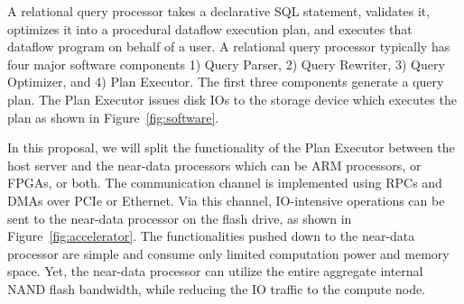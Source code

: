 \documentclass{article}
\begin{document}
A relational query processor takes a declarative SQL statement, validates it, optimizes it into a procedural dataflow execution plan, and executes that dataflow program on behalf of a user.
A relational query processor typically has four major software components 1) Query Parser, 2) Query Rewriter, 3) Query Optimizer, and 4) Plan Executor.
The first three components generate a query plan. The Plan Executor issues disk IOs to the storage device which executes the plan as shown in Figure~\ref{fig:software}.

In this proposal, we will split the functionality of the Plan Executor between the host server and the near-data processors which can be ARM processors, or FPGAs, or both. 
The communication channel is implemented using RPCs and DMAs over PCIe or Ethernet.
Via this channel, IO-intensive operations can be sent to the near-data processor on the flash drive, as shown in Figure~\ref{fig:accelerator}.
The functionalities pushed down to the near-data processor are simple and consume only limited computation power and memory space. 
Yet, the near-data processor can utilize the entire aggregate internal NAND flash bandwidth, while reducing the IO traffic to the compute node. 
\end{document}
